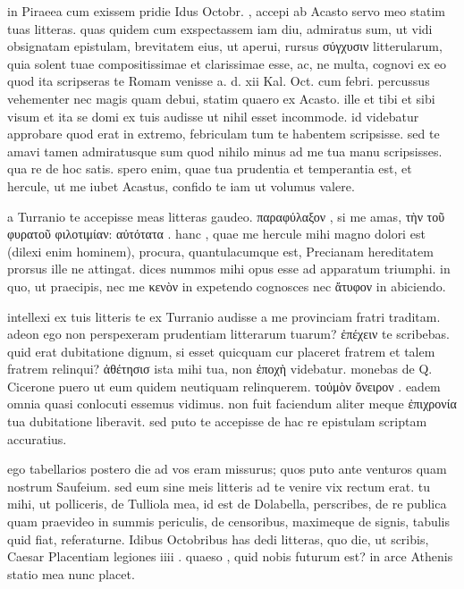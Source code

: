 


 in Piraeea cum exissem pridie Idus Octobr. , accepi ab Acasto servo meo statim tuas litteras. quas quidem cum exspectassem iam diu, admiratus sum, ut vidi obsignatam epistulam, brevitatem eius, ut aperui, rursus σύγχυσιν litterularum, quia solent tuae compositissimae et clarissimae esse, ac, ne multa, cognovi ex eo quod ita scripseras te Romam venisse a. d. xii Kal. Oct. cum febri. percussus vehementer nec magis quam debui, statim quaero ex Acasto. ille et tibi et sibi visum et ita se domi ex tuis audisse ut nihil esset incommode. id videbatur approbare quod erat in extremo, febriculam tum te habentem scripsisse. sed te amavi tamen admiratusque sum quod nihilo minus ad me tua manu scripsisses. qua re de hoc satis. spero enim, quae tua prudentia et temperantia est, et hercule, ut me iubet Acastus, confido te iam ut volumus valere.

 a Turranio te accepisse meas litteras gaudeo. παραφύλαξον , si me amas, τὴν τοῦ φυρατοῦ φιλοτιμίαν: αὐτότατα . hanc , quae me hercule mihi magno dolori est (dilexi enim hominem), procura, quantulacumque est, Precianam hereditatem prorsus ille ne attingat. dices nummos mihi opus esse ad apparatum triumphi. in quo, ut praecipis, nec me κενὸν in expetendo cognosces nec ἄτυφον in abiciendo.

 intellexi ex tuis litteris te ex Turranio audisse a me provinciam fratri traditam. adeon ego non perspexeram prudentiam litterarum tuarum? ἐπέχειν te scribebas. quid erat dubitatione dignum, si esset quicquam cur placeret fratrem et talem fratrem relinqui? ἀθέτησισ ista mihi tua, non ἐποχὴ videbatur. monebas de Q. Cicerone puero ut eum quidem neutiquam relinquerem. τοὐμὸν ὄνειρον . eadem omnia quasi conlocuti essemus vidimus. non fuit faciendum aliter meque ἐπιχρονία tua dubitatione liberavit. sed puto te accepisse de hac re epistulam scriptam accuratius.

 ego tabellarios postero die ad vos eram missurus; quos puto ante venturos quam nostrum Saufeium. sed eum sine meis litteris ad te venire vix rectum erat. tu mihi, ut polliceris, de Tulliola mea, id est de Dolabella, perscribes, de re publica quam praevideo in summis periculis, de censoribus, maximeque de signis, tabulis quid fiat, referaturne. Idibus Octobribus has dedi litteras, quo die, ut scribis, Caesar Placentiam legiones iiii . quaeso , quid nobis futurum est? in arce Athenis statio mea nunc placet.
